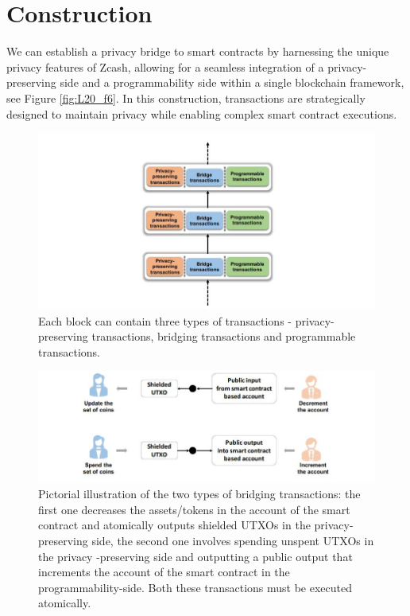 \section{Construction}
We can establish a privacy bridge to smart contracts by harnessing the unique privacy features of Zcash, allowing for a seamless integration of a privacy-preserving side and a programmability side within a single blockchain framework, see Figure \ref{fig:L20_f6}. In this construction, transactions are strategically designed to maintain privacy while enabling complex smart contract executions.\\
\begin{center}
	\begin{figure}
		\centering
		\includegraphics[width=0.8\linewidth]{Fig/20/F7}
		\caption{
			Each block can contain three types of transactions - privacy-preserving transactions, bridging transactions and programmable transactions.
		}
		\label{fig:L20_f7}
	\end{figure}
\end{center}
\begin{center}
	\begin{figure}
		\centering
		\includegraphics[width=0.8\linewidth]{Fig/20/F8}
		\caption{
			Pictorial illustration of the two types of bridging transactions: the first one decreases the assets/tokens in the account of the smart contract and atomically outputs shielded UTXOs in the privacy-preserving side, the second one involves spending unspent UTXOs in the privacy -preserving side and outputting a public output that increments the account of the smart contract in the programmability-side. Both these transactions must be executed atomically.
		}
		\label{fig:L20_f8}
	\end{figure}
\end{center}
